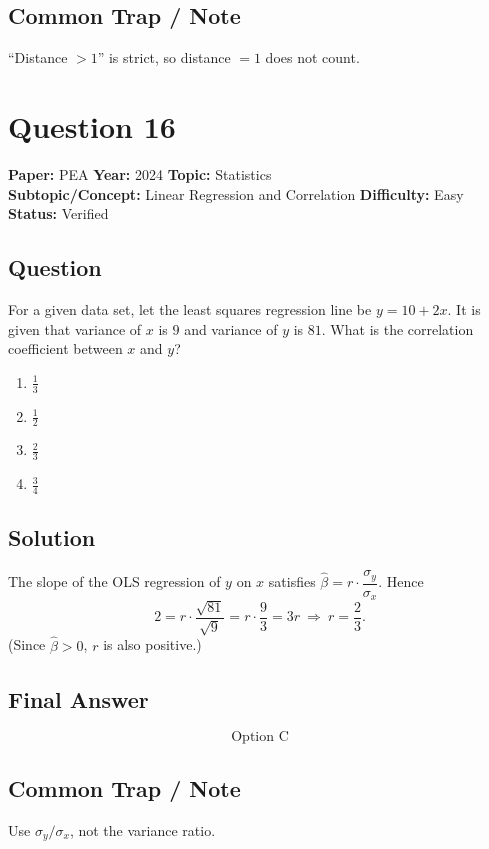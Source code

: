 \documentclass[11pt]{article}
\begin{document}
\subsection*{Common Trap / Note}
``Distance $>1$'' is strict, so distance $=1$ does not count.

\section*{Question 16}
\textbf{Paper:} PEA \quad \textbf{Year:} 2024 \quad \textbf{Topic:} Statistics \\
\textbf{Subtopic/Concept:} Linear Regression and Correlation \quad \textbf{Difficulty:} Easy \quad \textbf{Status:} Verified

\subsection*{Question}
For a given data set, let the least squares regression line be $y=10+2x$. It is given that variance of $x$ is $9$ and variance of $y$ is $81$. What is the correlation coefficient between $x$ and $y$?
\begin{enumerate}[label=(\Alph*)]
\item $\tfrac{1}{3}$
\item $\tfrac{1}{2}$
\item $\tfrac{2}{3}$
\item $\tfrac{3}{4}$
\end{enumerate}

\subsection*{Solution}
The slope of the OLS regression of $y$ on $x$ satisfies $\hat\beta = r\cdot\dfrac{\sigma_y}{\sigma_x}$. Hence
\[
2 = r\cdot\frac{\sqrt{81}}{\sqrt{9}}=r\cdot\frac{9}{3}=3r\ \Longrightarrow\ r=\frac{2}{3}.
\]
(Since $\hat\beta>0$, $r$ is also positive.)

\subsection*{Final Answer}
\[
\boxed{\text{Option C}}
\]

\subsection*{Common Trap / Note}
Use $\sigma_y/\sigma_x$, not the variance ratio.
\end{document}
